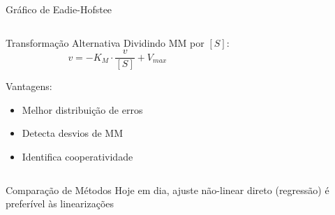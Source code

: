 \begin{frame}[shrink=5]{Gráfico de Eadie-Hofstee}
\begin{columns}
\begin{block}{Transformação Alternativa}
Dividindo MM por $[S]$:
\begin{equation*}
v = -K_M \cdot \frac{v}{[S]} + V_{max}
\end{equation*}

Vantagens:
\begin{itemize}
    \item Melhor distribuição de erros
    \item Detecta desvios de MM
    \item Identifica cooperatividade
\end{itemize}
\end{block}

\begin{center}
\end{center}
\end{columns}

\vspace{0.3cm}

\begin{exampleblock}{Comparação de Métodos}
Hoje em dia, ajuste não-linear direto (regressão) é preferível às linearizações
\end{exampleblock}
\end{frame}

